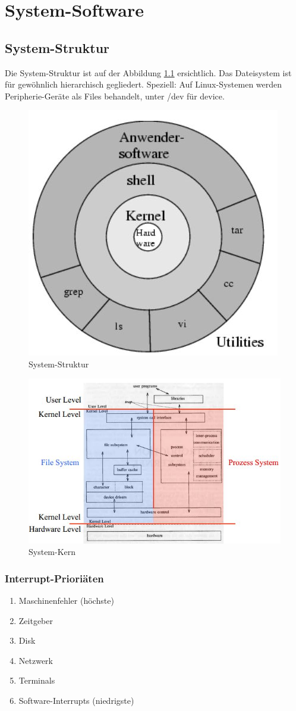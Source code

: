\chapter{System-Software}

\section{System-Struktur}
Die System-Struktur ist auf der Abbildung \ref{fig:system-software-system-struktur} ersichtlich. Das Dateisystem ist für gewöhnlich hierarchisch gegliedert. Speziell: Auf Linux-Systemen werden Peripherie-Geräte als Files behandelt, unter /dev für device.

\begin{figure}[h!]
\centering
\includegraphics[width=0.4\linewidth]{fig/system-software-system-struktur}
\caption{System-Struktur}
\label{fig:system-software-system-struktur}
\end{figure}

\begin{figure}[h!]
	\centering
	\includegraphics[width=0.7\linewidth]{fig/system-software-systemkern}
	\caption{System-Kern}
	\label{fig:system-software-systemkern}
\end{figure}

\subsection{Interrupt-Prioriäten}
\begin{enumerate}
	\item Maschinenfehler (höchste)
	\item Zeitgeber
	\item Disk
	\item Netzwerk
	\item Terminals
	\item Software-Interrupts (niedrigste)
\end{enumerate}

